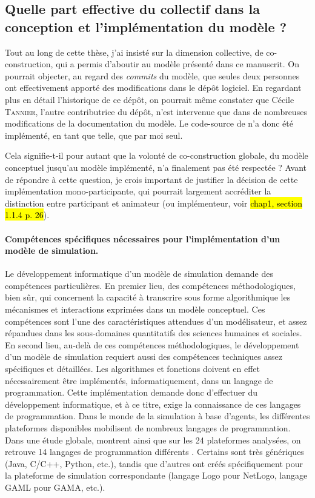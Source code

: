 \subsection{Quelle part effective du collectif dans la conception et l'implémentation du modèle ?}

Tout au long de cette thèse, j'ai insisté sur la dimension collective, de co-construction, qui a permis d'aboutir au modèle \simfeodal{} présenté dans ce manuscrit.
On pourrait objecter, au regard des \textit{commits} du modèle, que seules deux personnes ont effectivement apporté des modifications dans le dépôt logiciel.
En regardant plus en détail l'historique de ce dépôt, on pourrait même constater que Cécile \textsc{Tannier}, l'autre contributrice du dépôt, n'est intervenue \og que\fg{} dans de nombreuses modifications de la documentation du modèle.
Le code-source de \simfeodal{} n'a donc été implémenté, en tant que telle, que par moi seul.

Cela signifie-t-il pour autant que la volonté de co-construction globale, du modèle conceptuel jusqu'au modèle implémenté, n'a finalement pas été respectée ?
Avant de répondre à cette question, je crois important de justifier la décision de cette implémentation mono-participante, qui pourrait largement accréditer la distinction entre \og participant\fg{} et \og animateur\fg{} (ou \og implémenteur\fg{}, voir \hl{chap1, section 1.1.4 p. 26}).

\paragraph{Compétences spécifiques nécessaires pour l'implémentation d'un modèle de simulation.}
Le développement informatique d'un modèle de simulation demande des compétences particulières.
En premier lieu, des compétences méthodologiques, bien sûr, qui concernent la capacité à transcrire sous forme algorithmique les mécanismes et interactions exprimées dans un modèle conceptuel.
Ces compétences sont l'une des caractéristiques attendues d'un \og modélisateur\fg{}, et assez répandues dans les sous-domaines quantitatifs des sciences humaines et sociales.
En second lieu, au-delà de ces compétences méthodologiques, le développement d'un modèle de simulation requiert aussi des compétences techniques assez spécifiques et détaillées.
Les algorithmes et fonctions doivent en effet nécessairement être \og implémentés\fg{}, informatiquement, dans un langage de programmation.
Cette implémentation demande donc d'effectuer du \og développement informatique\fg{}, et à ce titre, exige la connaissance de ces langages de programmation.
Dans le monde de la simulation à base d'agents, les différentes plateformes disponibles mobilisent de nombreux langages de programmation.
Dans une étude globale, \textcite{kravari_survey_2015} montrent ainsi que sur les 24 plateformes analysées, on retrouve 14 langages de programmation différents \autocite[table 7, \S 4.3]{kravari_survey_2015}.
Certains sont très génériques (Java, C/C++, Python, etc.), tandis que d'autres ont créés spécifiquement pour la plateforme de simulation correspondante (langage Logo pour NetLogo, langage GAML pour GAMA, etc.).

